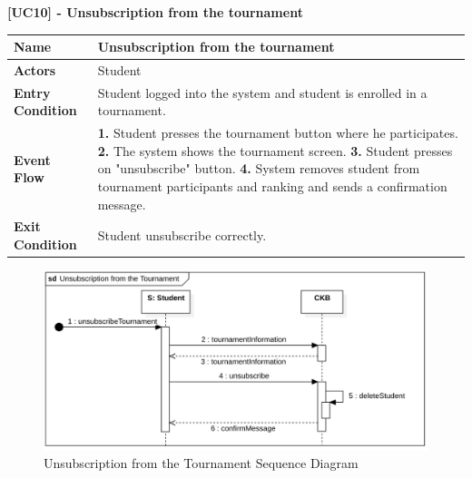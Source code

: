\clearpage

\raggedright
\textbf{[UC10] - Unsubscription from the tournament}
\begin{table}[h]
\begin{tabular}{|l|p{12cm}|} \hline 

\rule[-3mm]{0mm}{1cm}
\textbf{Name} & Unsubscription from the tournament \\ \hline 

\rule[-3mm]{0mm}{1cm}
\textbf{Actors} & Student \\ \hline 

\rule[-3mm]{0mm}{1cm}
\textbf{Entry Condition} & Student logged into the system and student is enrolled in a tournament.
\vspace{2pt}
\\ \hline 

\rule[-3mm]{0mm}{1cm}
\textbf{Event Flow} & 
\textbf{1.} Student presses the tournament button where he participates.
\vspace{4pt}
\newline
\textbf{2.} The system shows the tournament screen.
\vspace{4pt}
\newline
\textbf{3.} Student presses on "unsubscribe" button.
\vspace{4pt}
\newline
\textbf{4.} System removes student from tournament participants and ranking and sends a confirmation message.

\\ \hline 

\rule[-3mm]{0mm}{1cm}
\textbf{Exit Condition} & Student unsubscribe correctly. \\ \hline

\end{tabular}
\end{table}

\begin{figure}[h]
    \centering
    \includegraphics[scale=0.77]{images/SD/UnsubscriptionTournamentSD.png} 
    \caption{Unsubscription from the Tournament Sequence Diagram}
    \label{fig_UnsubscriptionTournamentSD}
\end{figure}

